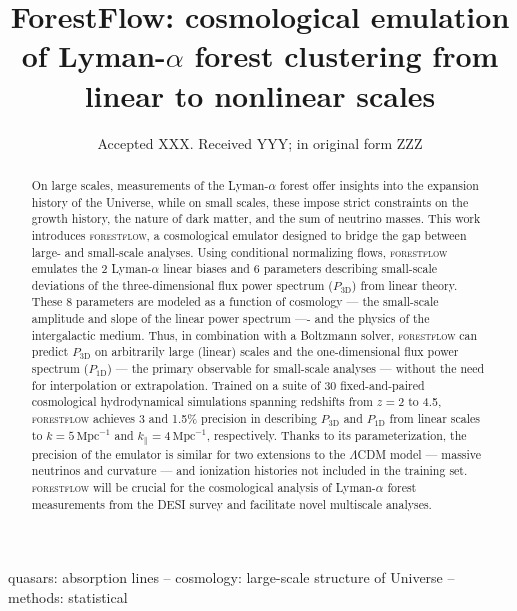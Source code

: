 \documentclass[fleqn,usenatbib]{mnras}
\title[ForestFlow: emulating Lyman-$\alpha$ forest clustering]{ForestFlow: cosmological emulation of Lyman-$\alpha$ forest clustering from linear to nonlinear scales}
\date{Accepted XXX. Received YYY; in original form ZZZ}
\newcommand{\iMpc}{\ensuremath{\,\mathrm{Mpc}^{-1}}}
\begin{document}
\label{firstpage}
\pagerange{\pageref{firstpage}--\pageref{lastpage}}
\maketitle


\begin{abstract}
On large scales, measurements of the Lyman-$\alpha$ forest offer insights into the expansion history of the Universe, while on small scales, these impose strict constraints on the growth history, the nature of dark matter, and the sum of neutrino masses. This work introduces \textsc{forestflow}, a cosmological emulator designed to bridge the gap between large- and small-scale analyses. Using conditional normalizing flows, \textsc{forestflow} emulates the 2 Lyman-$\alpha$ linear biases and 6 parameters describing small-scale deviations of the three-dimensional flux power spectrum ($P_\mathrm{3D}$) from linear theory. These 8 parameters are modeled as a function of cosmology --- the small-scale amplitude and slope of the linear power spectrum ---- and the physics of the intergalactic medium. Thus, in combination with a Boltzmann solver, \textsc{forestflow} can predict $P_\mathrm{3D}$ on arbitrarily large (linear) scales and the one-dimensional flux power spectrum ($P_\mathrm{1D}$) --- the primary observable for small-scale analyses --- without the need for interpolation or extrapolation. Trained on a suite of 30 fixed-and-paired cosmological hydrodynamical simulations spanning redshifts from $z=2$ to 4.5, \textsc{forestflow} achieves 3 and 1.5\% precision in describing $P_\mathrm{3D}$ and $P_\mathrm{1D}$ from linear scales to $k=5\iMpc$ and $k_\parallel=4\iMpc$, respectively. Thanks to its parameterization, the precision of the emulator is similar for two extensions to the $\Lambda$CDM model --- massive neutrinos and curvature --- and ionization histories not included in the training set. \textsc{forestflow} will be crucial for the cosmological analysis of Lyman-$\alpha$ forest measurements from the DESI survey and facilitate novel multiscale analyses.
\end{abstract}


\begin{keywords}
quasars: absorption lines -- cosmology: large-scale structure of Universe -- methods: statistical
\end{keywords}


\end{document}

